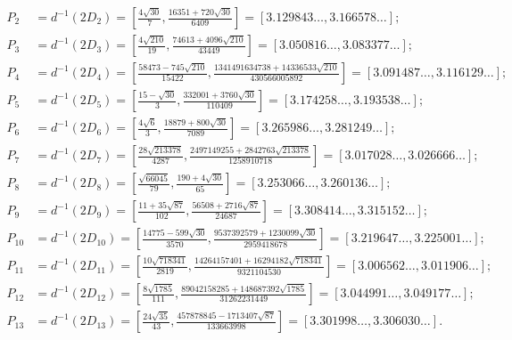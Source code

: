 \documentclass[10pt]{amsart}
\numberwithin{equation}{section}
\theoremstyle{definition}
\begin{document}
\begin{align*}
P_2&=d^{-1}(2D_2) = \left[\frac{4\sqrt{30}}7,\frac{16351+720\sqrt{30}}{6409}\right] = 
[3.129843\ldots, 3.166578\ldots]; \\
P_3&=d^{-1}(2D_3) = \left[\frac{4\sqrt{210}}{19},\frac{74613+4096\sqrt{210}}{43449}\right]=
[3.050816\ldots, 3.083377\ldots]; \\
P_4&=d^{-1}(2D_4) =
\left[\frac{58473-745\sqrt{210}}{15422},\frac{1341491634738+14336533\sqrt{210}}{430566005892}\right] =
[3.091487\dots,3.116129\dots];\\
P_5&=d^{-1}(2D_5) =
\left[\frac{15-\sqrt{30}}{3},\frac{332001+3760\sqrt{30}}{110409}\right] =
[3.174258\dots, 3.193538\dots]; \\ 
P_6&=d^{-1}(2D_6) = \left[\frac{4\sqrt{6}}{3},\frac{18879+800\sqrt{30}}{7089}\right] = 
[3.265986\dots,3.281249\dots];\\
P_7&=d^{-1}(2D_7) = \left[\frac{28\sqrt{213378}}{4287}, \frac{2497149255+2842763\sqrt{213378}}{1258910718}\right] = 
[3.017028\dots, 3.026666\dots];\\
P_8&=d^{-1}(2D_8) = \left[\frac{\sqrt{66045}}{79},\frac{190+4\sqrt{30}}{65}\right] = 
[3.253066\dots, 3.260136\dots];\\
P_9&=d^{-1}(2D_9) = \left[\frac{11+35\sqrt{87}}{102},\frac{56508+2716\sqrt{87}}{24687}\right] = 
[3.308414\dots,3.315152\dots];\\
P_{10}&=d^{-1}(2D_{10}) = \left[\frac{14775-599\sqrt{30}}{3570},\frac{9537392579+1230099\sqrt{30}}{2959418678}\right] = 
[3.219647\dots,3.225001\dots];\\
P_{11}& = d^{-1}(2D_{11}) = \left[\frac{10\sqrt{718341}}{2819},
\frac{14264157401+16294182 \sqrt{718341}}{9321104530}\right] =
[3.006562\dots, 3.011906\dots];\\
P_{12}& = d^{-1}(2D_{12})= \left[\frac{8\sqrt{1785}}{111},\frac{89042158285+148687392\sqrt{1785}}{31262231449} \right] =
[3.044991\dots, 3.049177\dots]; \\
P_{13}& = d^{-1}(2D_{13}) = \left[\frac{24\sqrt{35}}{43}, \frac{457878845-1713407 \sqrt{87}}{133663998}\right] = 
[3.301998\dots, 3.306030\dots].\\
\end{align*}
\end{document}

